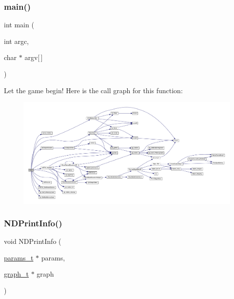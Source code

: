 \subsubsection{\texorpdfstring{main()}{main()}}
{\footnotesize\ttfamily int main (\begin{DoxyParamCaption}\item[{int}]{argc,  }\item[{char $\ast$}]{argv\mbox{[}$\,$\mbox{]} }\end{DoxyParamCaption})}

Let the game begin! Here is the call graph for this function\+:\nopagebreak
\begin{figure}[H]
\begin{center}
\leavevmode
\includegraphics[width=350pt]{a00326_a0ddf1224851353fc92bfbff6f499fa97_cgraph}
\end{center}
\end{figure}
\mbox{\label{a00326_aef57dff33874ea99e9584665424dbf22}} 
\subsubsection{\texorpdfstring{N\+D\+Print\+Info()}{NDPrintInfo()}}
{\footnotesize\ttfamily void N\+D\+Print\+Info (\begin{DoxyParamCaption}\item[{\hyperlink{a00706}{params\+\_\+t} $\ast$}]{params,  }\item[{\hyperlink{a00734}{graph\+\_\+t} $\ast$}]{graph }\end{DoxyParamCaption})}

